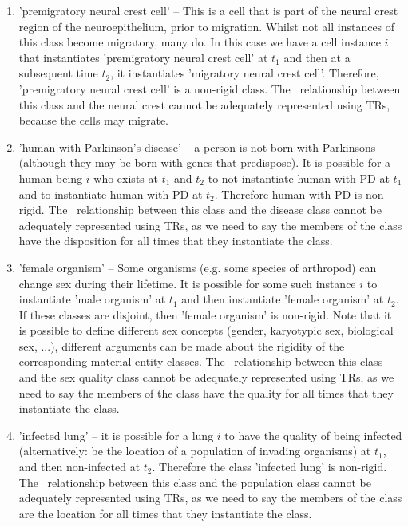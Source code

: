 \documentclass{bioinfo}
\def\partOf{\pr{part\_of}}
\begin{document}
\begin{enumerate}

\item 'premigratory neural crest cell' -- This is a cell that is part
  of the neural crest region of the neuroepithelium, prior to
  migration. Whilst not all instances of this class become migratory,
  many do. In this case we have a cell instance $i$ that instantiates
  'premigratory neural crest cell' at $t_1$ and then at a subsequent
  time $t_2$, it instantiates 'migratory neural crest
  cell'. Therefore, 'premigratory neural crest cell' is a non-rigid
  class. The \partOf\ relationship between this class and the neural
  crest cannot be adequately represented using TRs, because the cells
  may migrate.

\item 'human with Parkinson's disease' -- a person is not born with
  Parkinsons (although they may be born with genes that
  predispose). It is possible for a human being $i$ who exists at
  $t_1$ and $t_2$ to not instantiate human-with-PD at $t_1$ and to
  instantiate human-with-PD at $t_2$. Therefore human-with-PD is
  non-rigid. The \ relationship between this class
  and the disease class cannot be adequately represented using TRs, as
  we need to say the members of the class have the disposition for all
  times that they instantiate the class.

\item 'female organism' -- Some organisms (e.g. some species of
  arthropod) can change sex during their lifetime. It is possible for
  some such instance $i$ to instantiate 'male organism' at $t_1$ and
  then instantiate 'female organism' at $t_2$. If these classes are
  disjoint, then 'female organism' is non-rigid. Note that it is
  possible to define different sex concepts (gender, karyotypic sex,
  biological sex, ...), different arguments can be made about the
  rigidity of the corresponding material entity classes.  The
  \ relationship between this class and the sex
  quality class cannot be adequately represented using TRs, as we need
  to say the members of the class have the quality for all times
  that they instantiate the class.


\item 'infected lung' -- it is possible for a lung $i$ to have the
  quality of being infected (alternatively: be the location of a
  population of invading organisms) at $t_1$, and then non-infected at
  $t_2$. Therefore the class 'infected lung' is non-rigid.  The
  \ relationship between this class and the population
  class cannot be adequately represented using TRs, as we need to say
  the members of the class are the location for all times that they
  instantiate the class.



\end{enumerate}
\end{document}
